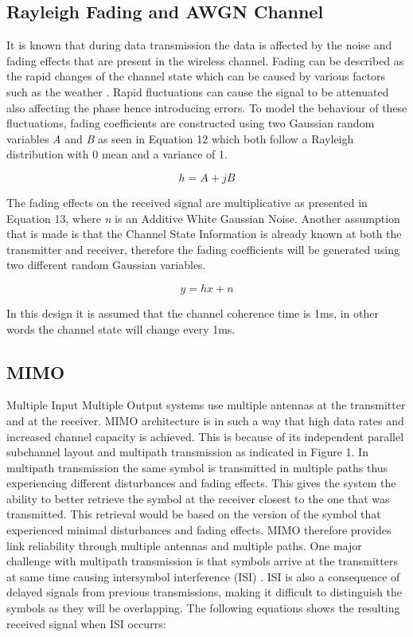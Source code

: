 \documentclass[pdftex,11pt,a4paper]{article}
\begin{document}
\subsection{Rayleigh Fading and AWGN Channel}
It is known that during data transmission the data is affected by the noise and fading effects that are present in the wireless channel. Fading can be described as the rapid changes of the channel state which can be caused by various factors such as the weather \cite{3}. Rapid fluctuations can cause the signal to be attenuated also affecting the phase hence introducing errors. To model the behaviour of these fluctuations, fading coefficients are constructed using two Gaussian random variables \textit{A} and \textit{B} as seen in Equation 12 which both follow a Rayleigh distribution with 0 mean and a variance of 1.

\begin{equation}
	h = A+jB
\end{equation}

The fading effects on the received signal are multiplicative as presented in Equation 13, where \textit{n} is an Additive White Gaussian Noise. Another assumption that is made is that the Channel State Information is already known at both the transmitter and receiver, therefore the fading coefficients will be generated using two different random Gaussian variables.

\begin{equation}
	y = hx +n
\end{equation}

In this design it is assumed that the channel coherence time is 1ms, in other words the channel state will change every 1ms.
\subsection{MIMO}
Multiple Input Multiple Output systems use multiple antennas at the transmitter and at the receiver. MIMO architecture is in such a way that high data rates and increased channel capacity is achieved. This is because of its independent parallel subchannel layout and multipath transmission \cite{50} as indicated in Figure 1. In multipath transmission the same symbol is transmitted in multiple paths thus experiencing different disturbances and fading effects. This gives the system the ability to better retrieve the symbol at the receiver closest to the one that was transmitted. This retrieval would be based on the version of the symbol that experienced minimal disturbances and fading effects. MIMO therefore provides link reliability through multiple antennas and multiple paths. One major challenge with multipath transmission is that symbols arrive at the transmitters at same time causing intersymbol interference (ISI) \cite{50}. ISI is also a consequence of delayed signals from previous transmissions, making it difficult to distinguish the symbols as they will be overlapping. The following equations shows the resulting received signal when ISI occurrs:
\end{document}
